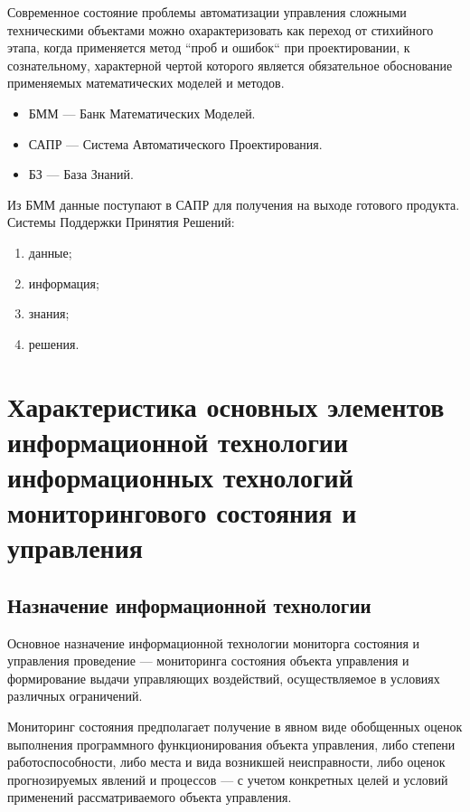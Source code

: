 \documentclass[a4paper,12pt]{report}
\begin{document}
	Современное состояние проблемы автоматизации управления сложными техническими
	объектами можно охарактеризовать как переход от стихийного этапа, когда
	применяется метод ``проб и ошибок`` при проектировании, к сознательному,
	характерной чертой которого является обязательное обоснование применяемых
	математических моделей и методов.\\

	\begin{itemize}
		\item БММ — Банк Математических Моделей.
		\item САПР — Система Автоматического Проектирования.
		\item БЗ — База Знаний. \\
	\end{itemize}

	Из БММ данные поступают в САПР для получения на выходе готового продукта.\\

	Системы Поддержки Принятия Решений:
	\begin{enumerate}
		\item данные;
		\item информация;
		\item знания;
		\item решения.
	\end{enumerate}


\section{Характеристика основных элементов информационной технологии
	информационных технологий мониторингового состояния и управления}


\subsection{Назначение информационной технологии}

	Основное назначение информационной технологии мониторга состояния и
	управления проведение --- мониторинга состояния объекта управления и
	формирование выдачи управляющих воздействий, осуществляемое в условиях
	различных ограничений.

	Мониторинг состояния предполагает получение в явном виде обобщенных оценок
	выполнения программного функционирования объекта управления, либо степени
	работоспособности, либо места и вида возникшей неисправности, либо оценок
	прогнозируемых явлений и процессов --- с учетом конкретных целей и условий
	применений рассматриваемого объекта управления.
\end{document}
